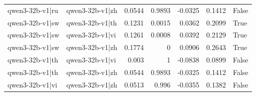 \begin{table}
\begin{tabular}{l l r r r r l}
qwen3-32b-v1|ru & qwen3-32b-v1|zh & 0.0544 & 0.9893 & -0.0325 & 0.1412 & False \\
qwen3-32b-v1|sw & qwen3-32b-v1|th & 0.1231 & 0.0015 & 0.0362 & 0.2099 & True \\
qwen3-32b-v1|sw & qwen3-32b-v1|vi & 0.1261 & 0.0008 & 0.0392 & 0.2129 & True \\
qwen3-32b-v1|sw & qwen3-32b-v1|zh & 0.1774 & 0 & 0.0906 & 0.2643 & True \\
qwen3-32b-v1|th & qwen3-32b-v1|vi & 0.003 & 1 & -0.0838 & 0.0899 & False \\
qwen3-32b-v1|th & qwen3-32b-v1|zh & 0.0544 & 0.9893 & -0.0325 & 0.1412 & False \\
qwen3-32b-v1|vi & qwen3-32b-v1|zh & 0.0513 & 0.996 & -0.0355 & 0.1382 & False \\
\bottomrule
\end{tabular}
\end{table}
